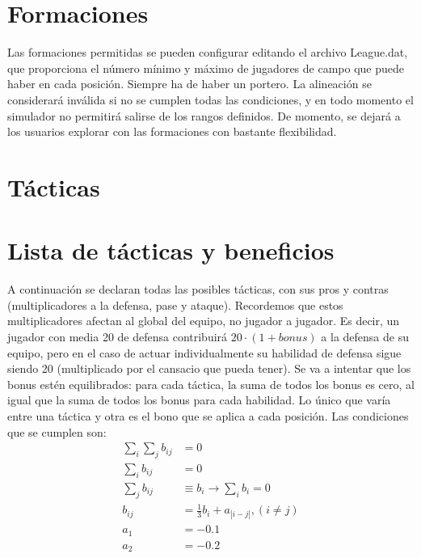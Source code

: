 \documentclass[a4paper,9pt]{article}
\begin{document}
\section{Formaciones}\label{sec:Formaciones}
Las formaciones permitidas se pueden configurar editando el archivo League.dat, que proporciona el número mínimo y máximo de jugadores de campo que puede haber en cada posición. Siempre ha de haber un portero. La alineación se considerará inválida si no se cumplen todas las condiciones, y en todo momento el simulador no permitirá salirse de los rangos definidos. De momento, se dejará a los usuarios explorar con las formaciones con bastante flexibilidad.

\section{Tácticas}\label{sec:Tacticas}
\section{Lista de tácticas y beneficios}\label{sec:ListaTacticas}
A continuación se declaran todas las posibles tácticas, con sus pros y contras (multiplicadores a la defensa, pase y ataque). Recordemos que estos multiplicadores afectan al global del equipo, no jugador a jugador. Es decir, un jugador con media 20 de defensa contribuirá $20\cdot (1+bonus)$ a la defensa de su equipo, pero en el caso de actuar individualmente su habilidad de defensa sigue siendo 20 (multiplicado por el cansacio que pueda tener). Se va a intentar que los bonus estén equilibrados: para cada táctica, la suma de todos los bonus es cero, al igual que la suma de todos los bonus para cada habilidad. Lo único que varía entre una táctica y otra es el bono que se aplica a cada posición. Las condiciones que se cumplen son:
\begin{align}
	\sum_i\sum_j b_{ij}&=0\\
	\sum_i b_{ij}&=0\\
	\sum_j b_{ij}&\equiv b_i\rightarrow \sum_i b_i = 0\\
	b_{ij}&=\frac{1}{3}b_i+a_{|i-j|},(i\neq j)\\
	a_1 &= -0.1\\
	a_2 &= -0.2
\end{align}
\end{document}
